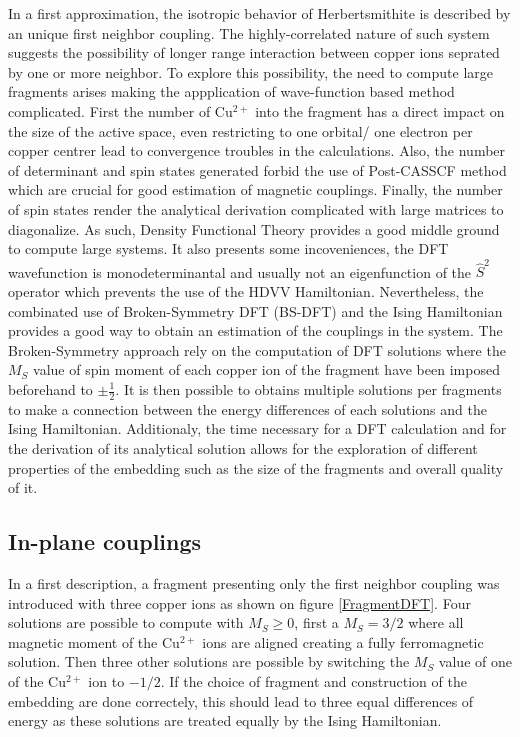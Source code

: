 \documentclass[10pt]{report}
\numberwithin{equation}{section}
\begin{document}
In a first approximation, the isotropic behavior of Herbertsmithite is described by an unique first neighbor coupling. 
The highly-correlated nature of such system suggests the possibility of longer range interaction between copper ions seprated by one or more neighbor. 
To explore this possibility, the need to compute large fragments arises making the appplication of wave-function based method complicated.
First the number of Cu$^{2+}$ into the fragment has a direct impact on the size of the active space, even restricting to one orbital/ one electron per copper centrer lead to convergence troubles in the calculations.
Also, the number of determinant and spin states generated forbid the use of Post-CASSCF method which are crucial for good estimation of magnetic couplings.
Finally, the number of spin states render the analytical derivation complicated with large matrices to diagonalize.
As such, Density Functional Theory provides a good middle ground to compute large systems. 
It also presents some incoveniences, the DFT wavefunction is monodeterminantal and usually not an eigenfunction of the $\hat{S}^2$ operator which prevents the use of the HDVV Hamiltonian.
Nevertheless, the combinated use of Broken-Symmetry DFT (BS-DFT) and the Ising Hamiltonian provides a good way to obtain an estimation of the couplings in the system.
The Broken-Symmetry approach rely on the computation of DFT solutions where the $M_S$ value of spin moment of each copper ion of the fragment have been imposed beforehand to $\pm \frac{1}{2}$. 
It is then possible to obtains multiple solutions per fragments to make a connection between the energy differences of each solutions and the Ising Hamiltonian.
Additionaly, the time necessary for a DFT calculation and for the derivation of its analytical solution allows for the exploration of different properties of the embedding such as the size of the fragments and overall quality of it.


\subsection*{In-plane couplings}

In a first description, a fragment presenting only the first neighbor coupling was introduced with three copper ions as shown on figure \ref{FragmentDFT}.
Four solutions are possible to compute with $M_S$$\ge$$0$, first a $M_S=3/2$ where all magnetic moment of the Cu$^{2+}$ ions are aligned creating a fully ferromagnetic solution. 
Then three other solutions are possible by switching the $M_S$ value of one of the Cu$^{2+}$ ion to $-1/2$. 
If the choice of fragment and construction of the embedding are done correctely, this should lead to three equal differences of energy as these solutions are treated equally by the Ising Hamiltonian.
\end{document}
